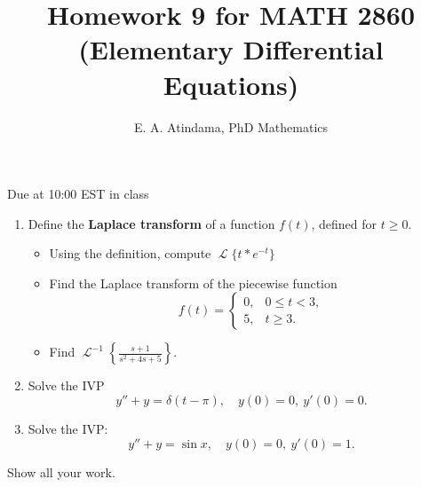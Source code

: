 \documentclass[a4paper,11pt,reqno]{amsart}
\title[MATH 2860 (Elementary Differential Equations)]{Homework 9 for MATH 2860 (Elementary Differential Equations)}
\author[Emmanuel Atindama]{E. A. Atindama, PhD Mathematics}
\numberwithin{equation}{section}
\DeclareMathOperator{\laplace}{\mathscr{L}}
\begin{document}
\maketitle

Due at 10:00 EST in class

\begin{enumerate}[1.]
  \item Define the \textbf{Laplace transform} of a function $f(t)$, defined for $t \geq 0$.
    \begin{itemize}
      \item[(a)] Using the definition, compute $\laplace\{t * e^{-t}\}$
      \item[(b)] Find the Laplace transform of the piecewise function
                \[f(t) = 
                  \begin{cases}
                  0, & 0 \leq t < 3,\\
                  5, & t \geq 3.
                  \end{cases}
                \]
      \item[(c)] Find $\laplace^{-1}\left\{\frac{s+1}{s^2+4s+5}\right\}$.
    \end{itemize}
    \vspace{1cm}

  \item Solve the IVP
    \[
    y'' + y = \delta(t-\pi), \quad y(0)=0,\ y'(0)=0.
    \]
    \vspace{1cm}
    
  \item Solve the IVP:
      \[
      y'' + y = \sin x, \quad y(0)=0, \ y'(0)=1.
      \]
\end{enumerate}
 

\textcolor{red!20}{Show all your work.}
\end{document}
